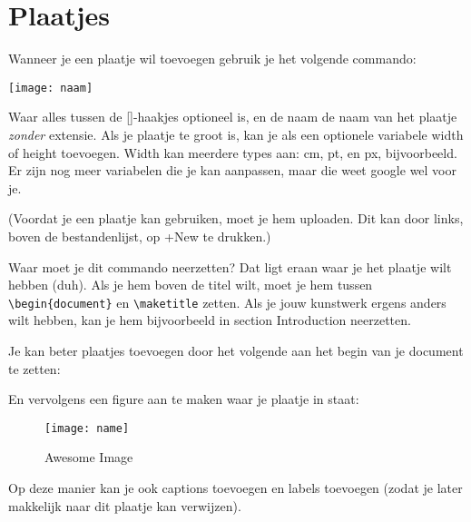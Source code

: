 \documentclass[a4paper,10pt]{article}
\begin{document}
\section{Plaatjes}
Wanneer je een plaatje wil toevoegen gebruik je het volgende commando: \\
\begin{verbbox}
\texttt{[image: naam]}
\end{verbbox}
\theverbbox

Waar alles tussen de []-haakjes optioneel is, en de naam de naam van het plaatje \emph{zonder} extensie. Als je plaatje te groot is, kan je als een optionele variabele width of height toevoegen. Width kan meerdere types aan: cm, pt, en px, bijvoorbeeld. Er zijn nog meer variabelen die je kan aanpassen, maar die weet google wel voor je.


(Voordat je een plaatje kan gebruiken, moet je hem uploaden. Dit kan door links, boven de bestandenlijst, op +New te drukken.)

Waar moet je dit commando neerzetten? Dat ligt eraan waar je het plaatje wilt hebben (duh). Als je hem boven de titel wilt, moet je hem tussen \verb| \begin{document}| en \verb|\maketitle| zetten. Als je jouw kunstwerk ergens anders wilt hebben, kan je hem bijvoorbeeld in section Introduction neerzetten. 


Je kan beter plaatjes toevoegen door het volgende aan het begin van je document te zetten:\\
\begin{verbbox}
\usepackage{graphicx}
\end{verbbox}
\theverbbox

En vervolgens een figure aan te maken waar je plaatje in staat:\\
\begin{verbbox}
\begin{figure}[p]
    \centering
    \texttt{[image: name]}
    \caption{Awesome Image}
    \label{fig:awesome_image}
\end{figure}
\end{verbbox}
\theverbbox

Op deze manier kan je ook captions toevoegen en labels toevoegen (zodat je later makkelijk naar dit plaatje kan verwijzen). 
\end{document}
